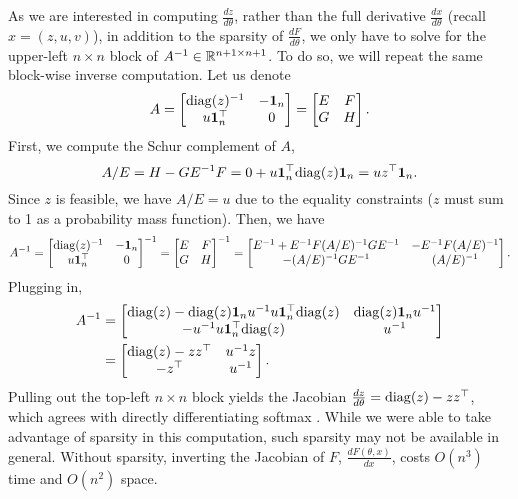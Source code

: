 \documentclass[11pt]{article}
\begin{document}
As we are interested in computing $\frac{dz}{d\theta}$,
rather than the full derivative $\frac{dx}{d\theta}$ (recall $x = (z,u,v)$),
in addition to the sparsity of $\frac{dF}{d\theta}$, 
we only have to solve for the upper-left $n\times n$ block of $A^{-1}\in\mathbb{R}^{n+1\times n+1}$.
To do so, we will repeat the same block-wise inverse computation.
Let us denote
$$A
= \begin{bmatrix} \mathrm{diag}(z)^{-1} & -\mathbf{1}_n \\ u\mathbf{1}_n^\top & 0 \end{bmatrix}
= \begin{bmatrix}E & F \\ G & H\end{bmatrix}.
$$
First, we compute the Schur complement of $A$,
\begin{equation}
A/E = H - GE^{-1}F = 0 + u\mathbf{1}_n^\top\mathrm{diag}(z)\mathbf{1}_n = uz^\top\mathbf{1}_n.
\end{equation}
Since $z$ is feasible, we have $A/E = u$ due to the equality constraints
($z$ must sum to 1 as a probability mass function).
Then, we have
\begin{equation}
A^{-1} = \begin{bmatrix}
\mathrm{diag}(z)^{-1} & -\mathbf{1}_n\\
u\mathbf{1}^\top_n & 0
\end{bmatrix}^{-1}
=\begin{bmatrix}E & F \\ G & H\end{bmatrix}^{-1}
= \begin{bmatrix}
E^{-1} + E^{-1}F(A/E)^{-1}GE^{-1} & -E^{-1}F(A/E)^{-1}\\
-(A/E)^{-1}GE^{-1} & (A/E)^{-1}
\end{bmatrix}.
\end{equation}
Plugging in,
\begin{equation}
\begin{aligned}
A^{-1} 
&= \begin{bmatrix}
\mathrm{diag}(z) - \mathrm{diag}(z)\mathbf{1}_nu^{-1}u\mathbf{1}^\top_n\mathrm{diag}(z)
    & \mathrm{diag}(z)\mathbf{1}_nu^{-1}\\
-u^{-1}u\mathbf{1}^\top_n \mathrm{diag}(z) & u^{-1}
\end{bmatrix}\\
&= \begin{bmatrix}
\mathrm{diag}(z) - zz^\top
    & u^{-1}z\\
    -z^\top & u^{-1}
\end{bmatrix}.
\end{aligned}
\end{equation}
Pulling out the top-left $n\times n$ block yields
the Jacobian $\frac{d z}{d\theta} = \mathrm{diag}(z) - zz^\top$,
which agrees with directly differentiating softmax \citep{sparsemax}.
While we were able to take advantage of sparsity in this computation,
such sparsity may not be available in general.
Without sparsity, inverting the Jacobian of $F$, $\frac{dF(\theta,x)}{dx}$,
costs $O(n^3)$ time and $O(n^2)$ space.
\end{document}
